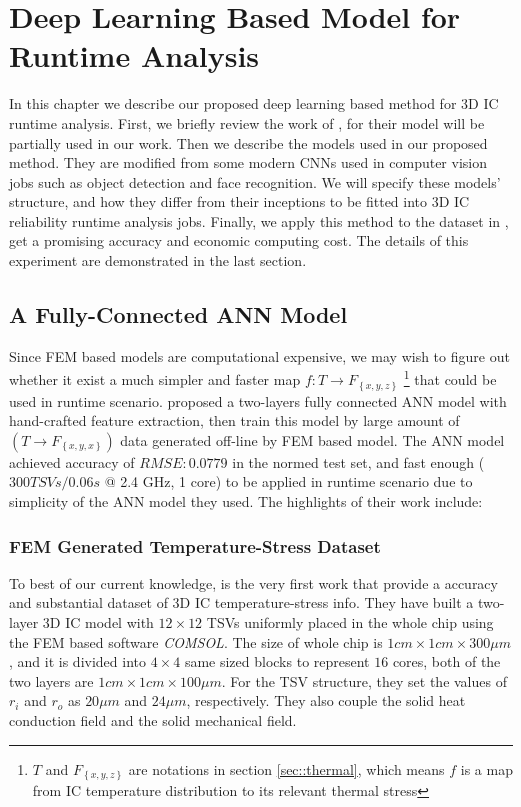 
\chapter{Deep Learning Based Model for Runtime Analysis}
In this chapter we describe our proposed deep learning based method for 3D IC runtime analysis.
First, we briefly review the work of \cite{Zhang2016Fast}, for their model
will be partially used in our work.
Then we describe the models used in our proposed method. They are modified from some modern
CNNs used in computer vision jobs such as object detection and face recognition.
We will specify these models' structure, and how they differ from their inceptions
to be fitted into 3D IC reliability runtime analysis jobs.
Finally, we apply this method to the dataset in \cite{Zhang2016Fast},
get a promising accuracy and economic computing cost.
The details of this experiment are demonstrated in the last section.

\section{A Fully-Connected ANN Model}
Since FEM based models are computational expensive, we may wish to figure out whether
it exist a much simpler and faster map $f: T \to F_{\left\{ x,y,z \right\}}$
\footnote{$T$ and $F_{\left\{ x,y,z \right\}}$ are notations in section \ref{sec::thermal}, which means
$f$ is a map from IC temperature distribution to its relevant thermal stress}
that could be used in runtime scenario.
\cite{Zhang2016Fast} proposed a two-layers fully connected ANN model with hand-crafted
feature extraction, then train this model by large amount of $(T \to F_{\left\{x,y,x\right\}})$ data
generated off-line by FEM based model. 
The ANN model achieved accuracy of $RMSE: 0.0779$ in the normed test set, and fast enough 
($300 TSVs / 0.06s$ @ 2.4 GHz, 1 core) to be applied
in runtime scenario due to simplicity of the ANN model they used.
The highlights of their work include:

\subsection{FEM Generated Temperature-Stress Dataset} \label{sec::FEM-data}
To best of our current knowledge, \cite{Zhang2016Fast} is the very first work that provide a
accuracy and substantial dataset of 3D IC temperature-stress info.
They have built a two-layer 3D IC model with $12\times12$ TSVs uniformly placed
in the whole chip using the FEM based software \textit{COMSOL}.
The size of whole chip is $1cm\times1cm\times300\mu m$, and it is
divided into $4\times4$ same sized blocks to represent $16$ cores,
both of the two layers are $1cm\times1cm\times100\mu m$. 
For the TSV structure, they set the values of $r_i$ and $r_o$
as $20\mu m$ and $24\mu m$, respectively. They also couple
the solid heat conduction field and the solid mechanical field.

